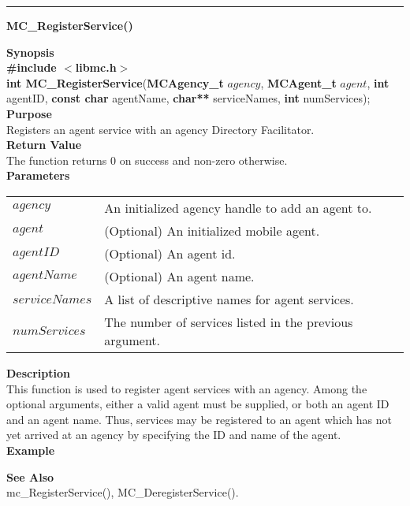 \noindent
\vspace{5pt}
\rule{6.5in}{0.015in}
\noindent
{}
{\LARGE \bf MC\_RegisterService()}\\
\label{api:MC_RegisterService()}

\noindent
{\bf Synopsis}\\
{\bf \#include $<$libmc.h$>$}\\
{\bf int MC\_RegisterService}({\bf MCAgency\_t} $agency$, {\bf MCAgent\_t} $agent$, {\bf int} agentID, {\bf const char} agentName, {\bf char**} serviceNames, {\bf int} numServices);\\

\noindent
{\bf Purpose}\\
Registers an agent service with an agency Directory Facilitator.\\

\noindent
{\bf Return Value}\\
The function returns 0 on success and non-zero otherwise.\\

\noindent
{\bf Parameters}
\vspace{-0.1in}
\begin{description}
\item
\begin{tabular}{p{23 mm}p{145 mm}} 
$agency$ & An initialized agency handle to add an agent to.\\
$agent$ & (Optional) An initialized mobile agent. \\
$agentID$ & (Optional) An agent id. \\
$agentName$ & (Optional) An agent name. \\
$serviceNames$ & A list of descriptive names for agent services. \\
$numServices$ & The number of services listed in the previous argument.
\end{tabular}
\end{description}

\noindent
{\bf Description}\\
This function is used to register agent services with an agency. Among
the optional arguments, either a valid agent must be supplied, or both
an agent ID and an agent name. Thus, services may be registered to an
agent which has not yet arrived at an agency by specifying the ID and name
of the agent.\\

\noindent
{\bf Example}\\
\noindent
{\footnotesize}

\noindent
{\bf See Also}\\
mc\_RegisterService(), MC\_DeregisterService().

